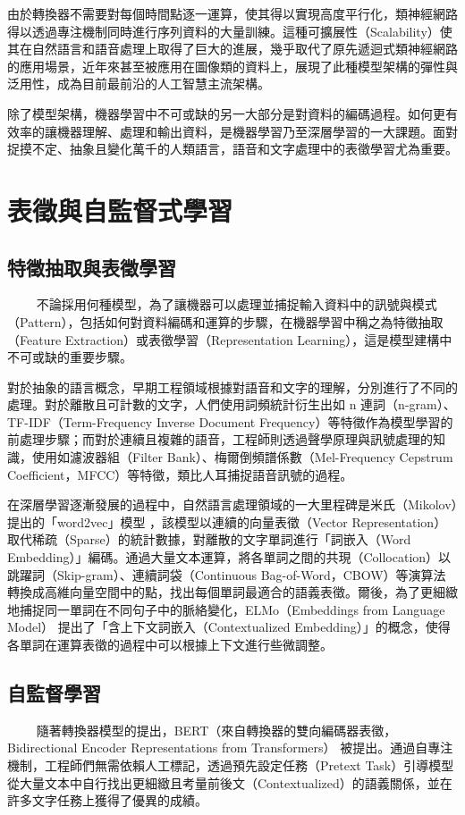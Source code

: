 由於轉換器不需要對每個時間點逐一運算，使其得以實現高度平行化，類神經網路得以透過專注機制同時進行序列資料的大量訓練。這種可擴展性（Scalability）使其在自然語言和語音處理上取得了巨大的進展，幾乎取代了原先遞迴式類神經網路的應用場景，近年來甚至被應用在圖像類的資料上\cite{dosovitskiy2021image}，展現了此種模型架構的彈性與泛用性，成為目前最前沿的人工智慧主流架構。

除了模型架構，機器學習中不可或缺的另一大部分是對資料的編碼過程。如何更有效率的讓機器理解、處理和輸出資料，是機器學習乃至深層學習的一大課題。面對捉摸不定、抽象且變化萬千的人類語言，語音和文字處理中的表徵學習尤為重要。

\section{表徵與自監督式學習}

\subsection{特徵抽取與表徵學習}
　　
不論採用何種模型，為了讓機器可以處理並捕捉輸入資料中的訊號與模式（Pattern），包括如何對資料編碼和運算的步驟，在機器學習中稱之為特徵抽取（Feature Extraction）或表徵學習（Representation Learning），這是模型建構中不可或缺的重要步驟。

對於抽象的語言概念，早期工程領域根據對語音和文字的理解，分別進行了不同的處理。對於離散且可計數的文字，人們使用詞頻統計衍生出如 n 連詞（n-gram）、TF-IDF（Term-Frequency Inverse Document Frequency）等特徵作為模型學習的前處理步驟；而對於連續且複雜的語音，工程師則透過聲學原理與訊號處理的知識，使用如濾波器組（Filter Bank）、梅爾倒頻譜係數（Mel-Frequency Cepstrum Coefficient，MFCC）等特徵，類比人耳捕捉語音訊號的過程。

在深層學習逐漸發展的過程中，自然語言處理領域的一大里程碑是米氏（Mikolov）提出的「word2vec」模型 \cite{mikolov_efficient_2013}，該模型以連續的向量表徵（Vector Representation）取代稀疏（Sparse）的統計數據，對離散的文字單詞進行「詞嵌入（Word Embedding）」編碼。通過大量文本運算，將各單詞之間的共現（Collocation）以跳躍詞（Skip-gram）、連續詞袋（Continuous Bag-of-Word，CBOW）等演算法轉換成高維向量空間中的點，找出每個單詞最適合的語義表徵。爾後，為了更細緻地捕捉同一單詞在不同句子中的脈絡變化，ELMo（Embeddings from Language Model）\cite{peters_deep_2018} 提出了「含上下文詞嵌入（Contextualized Embedding）」的概念，使得各單詞在運算表徵的過程中可以根據上下文進行些微調整。

\subsection{自監督學習}
　　
隨著轉換器模型的提出，BERT（來自轉換器的雙向編碼器表徵，Bidirectional Encoder Representations from Transformers）\cite{devlin_bert_2019} 被提出。通過自專注機制，工程師們無需依賴人工標記，透過預先設定任務（Pretext Task）引導模型從大量文本中自行找出更細緻且考量前後文（Contextualized）的語義關係，並在許多文字任務上獲得了優異的成績。


